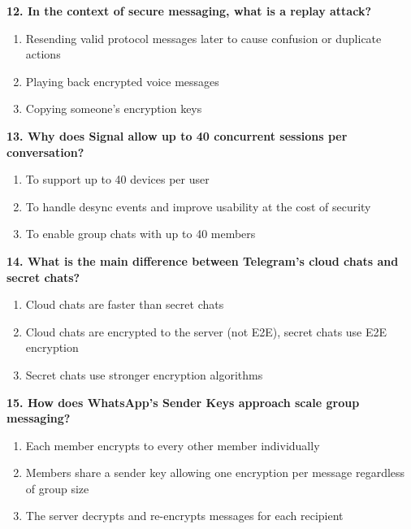 \documentclass[10pt,a4paper,american]{article}
\begin{document}
\textbf{12. In the context of secure messaging, what is a replay attack?}
\begin{enumerate}[label=\alph*)]
	\item Resending valid protocol messages later to cause confusion or duplicate actions
	\item Playing back encrypted voice messages
	\item Copying someone's encryption keys
\end{enumerate}

\vspace{0.5em}

\textbf{13. Why does Signal allow up to 40 concurrent sessions per conversation?}
\begin{enumerate}[label=\alph*)]
	\item To support up to 40 devices per user
	\item To handle desync events and improve usability at the cost of security
	\item To enable group chats with up to 40 members
\end{enumerate}

\vspace{0.5em}

\textbf{14. What is the main difference between Telegram's cloud chats and secret chats?}
\begin{enumerate}[label=\alph*)]
	\item Cloud chats are faster than secret chats
	\item Cloud chats are encrypted to the server (not E2E), secret chats use E2E encryption
	\item Secret chats use stronger encryption algorithms
\end{enumerate}

\vspace{0.5em}

\textbf{15. How does WhatsApp's Sender Keys approach scale group messaging?}
\begin{enumerate}[label=\alph*)]
	\item Each member encrypts to every other member individually
	\item Members share a sender key allowing one encryption per message regardless of group size
	\item The server decrypts and re-encrypts messages for each recipient
\end{enumerate}

\vspace{0.5em}
\end{document}
